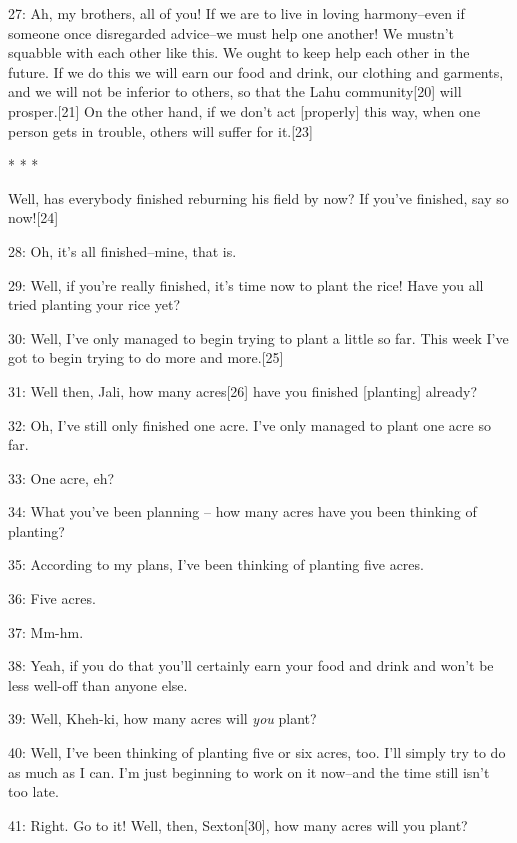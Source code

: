 {\large{}27: Ah, my brothers, all of you! If we are to live in loving harmony--even
if  someone once disregarded advice--we must help one another! We mustn't squabble
with each other like this. We ought to keep help each other in the future. If we
do this we will earn our food and drink, our clothing and garments, and we will
not be inferior to others, so that the Lahu community[20] will prosper.[21] On
the other hand, if we don't act [properly] this way, when one person gets in trouble,
others will suffer for it.[23]}

\begin{center}
{\large{}* * *}
\end{center}

\leftskip=0pt
{\large{}Well, has everybody finished reburning his field by now? If you've finished,
say so now![24]}

{\large{}28: Oh, it's all finished--mine, that is.}

{\large{}29: Well, if you're really finished, it's time now to plant the rice!
Have you all tried planting your rice yet?}

{\large{}30: Well, I've only managed to begin trying to plant a little so far.
This week I've got to begin trying to do more and more.[25]}

{\large{}31: Well then, Jali, how many acres[26] have you finished [planting] already?
}

{\large{}32: Oh, I've still only finished one acre. I've only managed to plant
one acre so far.}

{\large{}33: One acre, eh?}

{\large{}34: What you've been planning -- how many acres have you been thinking
of planting?}

{\large{}35: According to my plans, I've been thinking of planting five acres.}

{\large{}36: Five acres. }

{\large{}37: Mm-hm.}

{\large{}38: Yeah, if you do that you'll certainly earn your food and drink and
won't be less well-off than anyone else. }

{\large{}39: Well, Kheh-ki, how many acres will }{\large{}\emph{you}}{\large{}
plant? }

{\large{}40: Well, I've been thinking of planting five or six acres, too. I'll
simply try to do as much as I can. I'm just beginning to work on it now--and the
time still isn't too late.}

{\large{}41: Right. Go to it! Well, then, Sexton[30], how many acres will you plant?
}

